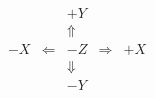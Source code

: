 \documentclass{article}
\begin{document}
\pagecolor{blue!20}
\huge \bf
\[
\begin{array}{ccccc}
  && +Y && \\
  &&\Uparrow && \\
-X & \Leftarrow & -Z & \Rightarrow & +X \\
  &&\Downarrow && \\
&& -Y && 
\end{array}
\]
\end{document}
